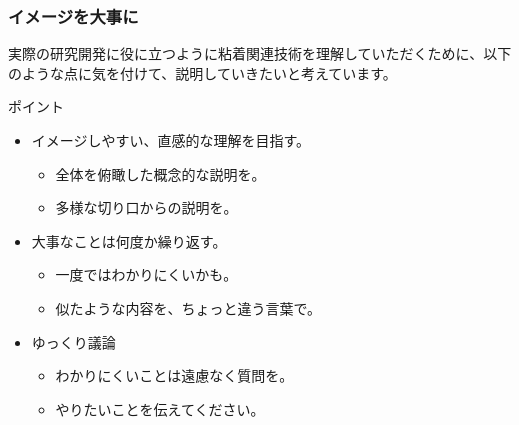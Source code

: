 \documentclass[unicode,12pt]{beamer}%
\begin{document}
\begin{frame}
	\frametitle{イメージを大事に}
		実際の研究開発に役に立つように粘着関連技術を理解していただくために、以下のような点に気を付けて、説明していきたいと考えています。
		\begin{block}{ポイント}
			\begin{itemize}	
				\item イメージしやすい、直感的な理解を目指す。
					\begin{itemize}
						\item 全体を俯瞰した概念的な説明を。
						\item 多様な切り口からの説明を。
					\end{itemize}
				\item 大事なことは何度か繰り返す。
					\begin{itemize}
						\item 一度ではわかりにくいかも。
						\item 似たような内容を、ちょっと違う言葉で。
					\end{itemize}
				\item ゆっくり議論
					\begin{itemize}
						\item わかりにくいことは遠慮なく質問を。
						\item やりたいことを伝えてください。
					\end{itemize}
			\end{itemize}
		\end{block}
\end{frame}
\end{document}
